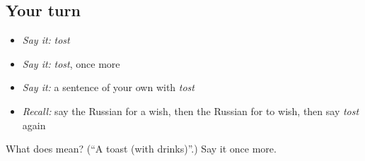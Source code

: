 \subsection*{Your turn}
\begin{itemize}
\raggedright
  \item \emph{Say it:} \emph{tost}
  \item \emph{Say it:} \emph{tost}, once more
  \item \emph{Say it:} a sentence of your own with \emph{tost}
  \item \emph{Recall:} say the Russian for a wish, then the Russian for to wish, then say \emph{tost} again
\end{itemize}

\begin{tcolorbox}[breakable,colback=teal!4,colframe=teal!35!black,title={Before you move on}]
What does  mean? (\textquotedblleft{}A toast (with drinks)\textquotedblright{}.) Say it once more.
\end{tcolorbox}

